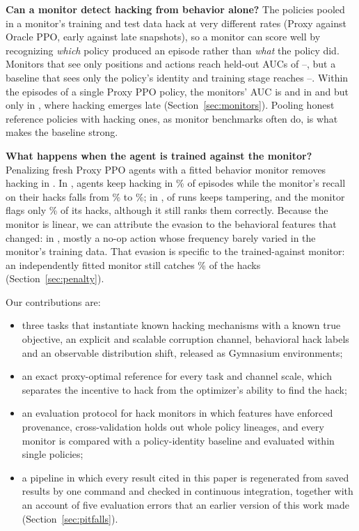 \textbf{Can a monitor detect hacking from behavior alone?} The policies pooled
in a monitor's training and test data hack at very different rates (Proxy
against Oracle PPO, early against late snapshots), so a monitor can score well
by recognizing \emph{which} policy produced an episode rather than \emph{what}
the policy did.
Monitors that see only positions and actions reach held-out AUCs of
--, but a baseline that sees
only the policy's identity and training stage reaches
--. Within the
episodes of a single Proxy PPO policy, the monitors' AUC is
 and
 in \ST{} and \GT{} but only
 in \PF{}, where hacking
emerges late (Section~\ref{sec:monitors}). Pooling honest reference policies
with hacking ones, as monitor benchmarks often do, is what makes the baseline
strong.

\textbf{What happens when the agent is trained against the monitor?} Penalizing
fresh Proxy PPO agents with a fitted behavior monitor removes hacking in \PF{}.
In \GT{}, agents keep hacking in \% of episodes while
the monitor's recall on their hacks falls from
\% to \%; in
\ST{},  of  runs keeps
tampering, and the monitor flags only \% of
its hacks, although it still ranks them correctly. Because the monitor is linear, we can attribute the evasion to the
behavioral features that changed: in \GT{}, mostly a no-op action whose
frequency barely varied in the monitor's training data. That evasion is specific
to the trained-against monitor: an independently fitted monitor still catches
\% of the hacks (Section~\ref{sec:penalty}).

Our contributions are:
\begin{itemize}[leftmargin=*,itemsep=1pt]
\item three tasks that instantiate known hacking mechanisms with a known true
objective, an explicit and scalable corruption channel, behavioral hack labels
and an observable distribution shift, released as Gymnasium environments;
\item an exact proxy-optimal reference for every task and channel scale, which
separates the incentive to hack from the optimizer's ability to find the hack;
\item an evaluation protocol for hack monitors in which features have enforced
provenance, cross-validation holds out whole policy lineages, and every monitor
is compared with a policy-identity baseline and evaluated within single
policies;
\item a pipeline in which every result cited in this paper is regenerated from
saved results by one command and checked in continuous integration, together with an
account of five evaluation errors that an earlier version of this work made
(Section~\ref{sec:pitfalls}).
\end{itemize}

